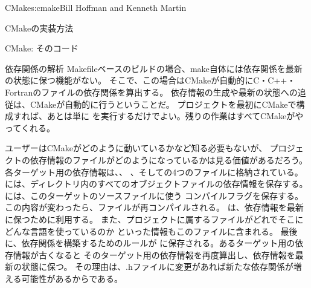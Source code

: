 \begin{aosachapter}{CMake}{s:cmake}{Bill Hoffman and Kenneth Martin}
\begin{aosasect1}{CMakeの実装方法}
\begin{aosasect2}{CMake: そのコード}
\begin{aosasect3}{依存関係の解析}
Makefileベースのビルドの場合、make自体には依存関係を最新の状態に保つ機能がない。
そこで、この場合はCMakeが自動的にC・C++・Fortranのファイルの依存関係を算出する。
依存情報の生成や最新の状態への追従は、CMakeが自動的に行うということだ。
プロジェクトを最初にCMakeで構成すれば、あとは単に
を実行するだけでよい。残りの作業はすべてCMakeがやってくれる。

ユーザーはCMakeがどのように動いているかなど知る必要もないが、
プロジェクトの依存情報のファイルがどのようになっているかは見る価値があるだろう。
各ターゲット用の依存情報は、、
、そしての4つのファイルに格納されている。
には、ディレクトリ内のすべてのオブジェクトファイルの依存情報を保存する。
には、このターゲットのソースファイルに使う
コンパイルフラグを保存する。この内容が変わったら、ファイルが再コンパイルされる。
は、依存情報を最新に保つために利用する。
また、プロジェクトに属するファイルがどれでそこにどんな言語を使っているのか
といった情報もこのファイルに含まれる。
最後に、依存関係を構築するためのルールが
に保存される。あるターゲット用の依存情報が古くなると
そのターゲット用の依存情報を再度算出し、依存情報を最新の状態に保つ。
その理由は、.hファイルに変更があれば新たな依存関係が増える可能性があるからである。


\end{aosasect3}
\end{aosasect2}
\end{aosasect1}
\end{aosachapter}
